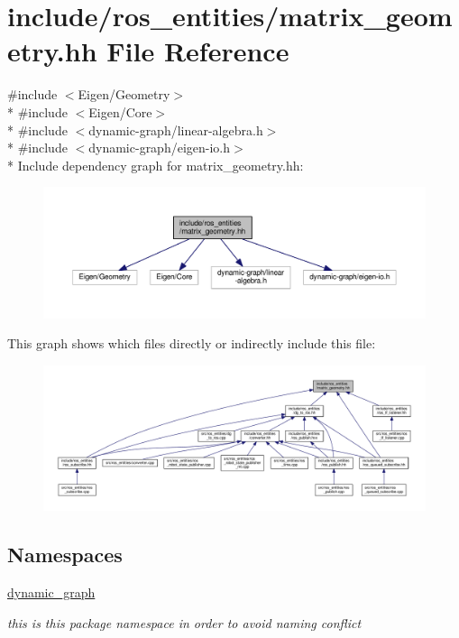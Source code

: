 \hypertarget{matrix__geometry_8hh}{}\section{include/ros\+\_\+entities/matrix\+\_\+geometry.hh File Reference}
\label{matrix__geometry_8hh}
{\ttfamily \#include $<$Eigen/\+Geometry$>$}\\*
{\ttfamily \#include $<$Eigen/\+Core$>$}\\*
{\ttfamily \#include $<$dynamic-\/graph/linear-\/algebra.\+h$>$}\\*
{\ttfamily \#include $<$dynamic-\/graph/eigen-\/io.\+h$>$}\\*
Include dependency graph for matrix\+\_\+geometry.\+hh\+:
\nopagebreak
\begin{figure}[H]
\begin{center}
\leavevmode
\includegraphics[width=350pt]{matrix__geometry_8hh__incl}
\end{center}
\end{figure}
This graph shows which files directly or indirectly include this file\+:
\nopagebreak
\begin{figure}[H]
\begin{center}
\leavevmode
\includegraphics[width=350pt]{matrix__geometry_8hh__dep__incl}
\end{center}
\end{figure}
\subsection*{Namespaces}
\begin{DoxyCompactItemize}
\item 
 \hyperlink{namespacedynamic__graph}{dynamic\+\_\+graph}
\begin{DoxyCompactList}\small\item\em this is this package namespace in order to avoid naming conflict \end{DoxyCompactList}\end{DoxyCompactItemize}
